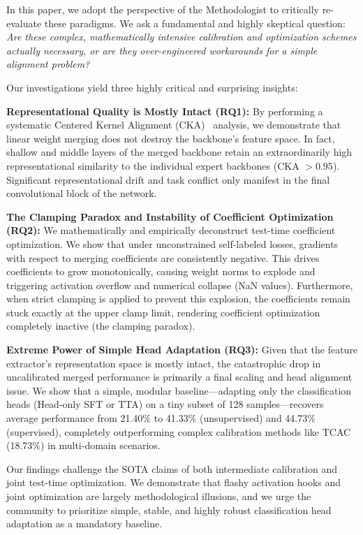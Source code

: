 \documentclass{article}
\theoremstyle{plain}
\theoremstyle{definition}
\theoremstyle{remark}
\begin{document}
In this paper, we adopt the perspective of the Methodologist to critically re-evaluate these paradigms. We ask a fundamental and highly skeptical question: \emph{Are these complex, mathematically intensive calibration and optimization schemes actually necessary, or are they over-engineered workarounds for a simple alignment problem?}

Our investigations yield three highly critical and surprising insights:

\textbf{Representational Quality is Mostly Intact (RQ1):} By performing a systematic Centered Kernel Alignment (CKA)~\cite{kornblith2019similarity} analysis, we demonstrate that linear weight merging does not destroy the backbone's feature space. In fact, shallow and middle layers of the merged backbone retain an extraordinarily high representational similarity to the individual expert backbones (CKA $> 0.95$). Significant representational drift and task conflict only manifest in the final convolutional block of the network.

\textbf{The Clamping Paradox and Instability of Coefficient Optimization (RQ2):} We mathematically and empirically deconstruct test-time coefficient optimization. We show that under unconstrained self-labeled losses, gradients with respect to merging coefficients are consistently negative. This drives coefficients to grow monotonically, causing weight norms to explode and triggering activation overflow and numerical collapse (NaN values). Furthermore, when strict clamping is applied to prevent this explosion, the coefficients remain stuck exactly at the upper clamp limit, rendering coefficient optimization completely inactive (the clamping paradox).

\textbf{Extreme Power of Simple Head Adaptation (RQ3):} Given that the feature extractor's representation space is mostly intact, the catastrophic drop in uncalibrated merged performance is primarily a final scaling and head alignment issue. We show that a simple, modular baseline---adapting only the classification heads (Head-only SFT or TTA) on a tiny subset of 128 samples---recovers average performance from 21.40\% to 41.33\% (unsupervised) and 44.73\% (supervised), completely outperforming complex calibration methods like TCAC (18.73\%) in multi-domain scenarios.

Our findings challenge the SOTA claims of both intermediate calibration and joint test-time optimization. We demonstrate that flashy activation hooks and joint optimization are largely methodological illusions, and we urge the community to prioritize simple, stable, and highly robust classification head adaptation as a mandatory baseline.
\end{document}
